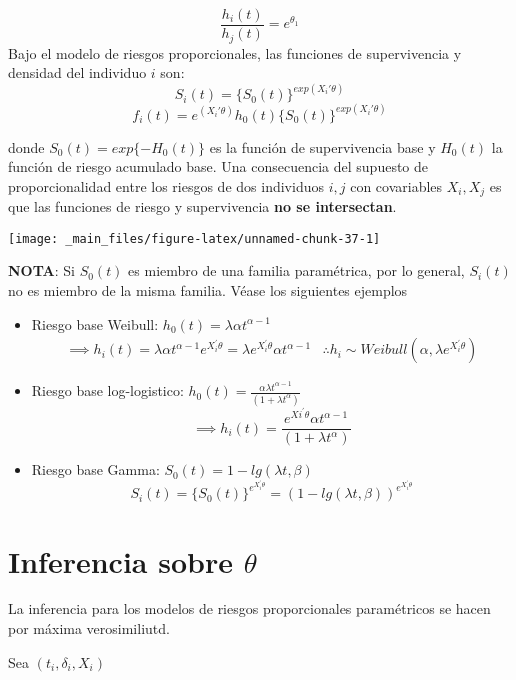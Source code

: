 \documentclass[
  a4paper,
  oneside,
  openany]{book}
\begin{document}
\[\frac{h_i(t)}{h_j(t)} = e^{\theta_1}\]
Bajo el modelo de riesgos proporcionales, las funciones de supervivencia y densidad del individuo \(i\) son:
\[S_i(t)=\{S_0(t)\}^{exp(X_i'\theta)}\]
\[f_i(t)=e^{(X_i'\theta)}h_0(t)\{S_0(t)\}^{exp(X_i'\theta)}\]

donde \(S_0(t)=exp\{-H_0(t)\}\) es la función de supervivencia base y \(H_0(t)\) la función de riesgo acumulado base.
Una consecuencia del supuesto de proporcionalidad entre los riesgos de dos individuos \(i,j\) con covariables \(X_i,X_j\) es que las funciones de riesgo y supervivencia \textbf{no se intersectan}.

\begin{center}\texttt{[image: \_main\_files/figure-latex/unnamed-chunk-37-1]} \end{center}

\textbf{NOTA}: Si \(S_0(t)\) es miembro de una familia paramétrica, por lo general, \(S_i(t)\) no es miembro de la misma familia. Véase los siguientes ejemplos

\begin{itemize}
\item
  Riesgo base Weibull: \(h_0(t) = \lambda\alpha t^{\alpha-1}\)
  \[
  \begin{array}{cc}
  \implies h_i(t) = \lambda \alpha t^{\alpha-1}e^{X_i^{'}\theta} = \lambda e^{X_i^{'}\theta}\alpha t^{\alpha-1}&\therefore h_i\sim Weibull(\alpha, \lambda e^{X_i^{'}\theta})
  \end{array}
  \]
\item
  Riesgo base log-logistico: \(h_0(t) = \frac{\alpha \lambda t^{\alpha-1}}{(1+\lambda t^{\alpha})}\)
  \[
  \implies h_i(t) = \frac{e^{Xi^{'}\theta}\alpha t^{\alpha -1}}{(1+\lambda t^{\alpha})}
  \]
\item
  Riesgo base Gamma: \(S_0(t) = 1-lg(\lambda t, \beta)\)
  \[
  S_i(t) = \{S_0(t)\}^{e^{X_i^{'}\theta}} = \left(1-lg(\lambda t, \beta)\right)^{e^{X_i^{'}\theta}}
  \]
\end{itemize}

\hypertarget{inferencia-sobre-theta}{%
\section{\texorpdfstring{Inferencia sobre \(\theta\)}{Inferencia sobre \textbackslash theta}}\label{inferencia-sobre-theta}}

La inferencia para los modelos de riesgos proporcionales paramétricos se hacen por máxima verosimiliutd.

Sea \((t_i, \delta_i, X_i)\)
\end{document}
